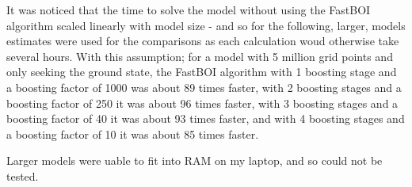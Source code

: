 It was noticed that the time to solve the model without using the FastBOI algorithm scaled linearly with model size - and so for the following, larger, models estimates were used for the comparisons as each calculation woud otherwise take several hours. With this assumption; for a model with 5 million grid points and only seeking the ground state, the FastBOI algorithm with 1 boosting stage and a boosting factor of 1000 was about 89 times faster, with 2 boosting stages and a boosting factor of 250 it was about 96 times faster, with 3 boosting stages and a boosting factor of 40 it was about 93 times faster, and with 4 boosting stages and a boosting factor of 10 it was about 85 times faster.

Larger models were uable to fit into RAM on my laptop, and so could not be tested.


%
%

